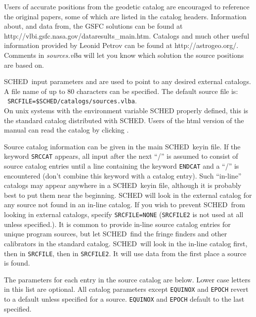\documentclass{report}
\newcommand{\sched}{{\sc SCHED}}
\newcommand{\schedb}{{\sc SCHED~}}
\begin{document}
Users of accurate positions from the geodetic catalog are encouraged
to reference the original papers, some of which are listed in the
catalog headers.  Information about, and data from, the GSFC solutions
can be found at
{http://vlbi.gsfc.nasa.gov/dataresults\_main.htm}.  Catalogs and much
other useful information provided by Leonid Petrov can be found at
 {http://astrogeo.org/}.
Comments in {\sl sources.vlba} will let you know which solution the
source positions are based on.

\schedb input parameters  and
 are used to point to any desired
external catalogs.  A file name of up to 80 characters can be
specified. The default source file is: \\ {\tt
SRCFILE=\$SCHED/catalogs/sources.vlba}.  \\ On unix systems with the
environment variable SCHED properly defined, this is the standard
catalog distributed with \sched.  Users of the html version of the
manual can read the catalog by clicking
.

Source catalog information can be given in the main \schedb keyin
file. If the keyword {\tt SRCCAT} appears, all input after the next
``/'' is assumed to consist of source catalog entries until a line
 containing the keyword {\tt ENDCAT} and a ``/'' is encountered (don't
combine this keyword with a catalog entry).  Such ``in-line'' catalogs
may appear anywhere in a \schedb keyin file, although it is probably
best to put them near the beginning.  {\sc SCHED} will look in the
external catalog for any source not found in an in-line catalog.  If
you wish to prevent \schedb from looking in external catalogs, specify
{\tt SRCFILE=NONE} ({\tt SRCFILE2} is not used at all unless
specified.).  It is common to provide in-line source catalog entries
for unique program sources, but let \schedb find the fringe finders
and other calibrators in the standard catalog.  \schedb will look in
the in-line catalog first, then in {\tt SRCFILE}, then in {\tt SRCFILE2}.
It will use data from the first place a source is found.

The parameters for each entry in the source catalog are below.  Lower
case letters in this list are optional.  All catalog parameters except
{\tt EQUINOX} and {\tt EPOCH} revert to a default unless specified
for a source. {\tt EQUINOX} and {\tt EPOCH} default to the last specified.
\end{document}
